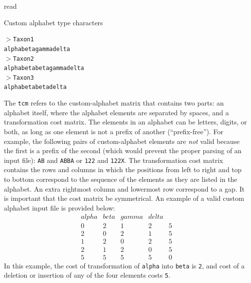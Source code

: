 \begin{command}{read}{}
\begin{arguments}
\begin{argumentgroup}{Custom alphabet type characters}
{          \texttt{$>$Taxon1\\
	\indent alphabetagammadelta\\
	\indent $>$Taxon2\\
	\indent alphabetabetagammadelta\\
	\indent $>$Taxon3\\
	\indent alphabetabetadelta\\}
	
             The \texttt{tcm} refers to the custom-alphabet matrix that contains two parts:
            an alphabet itself, where the alphabet elements are separated by spaces, and a
            transformation cost matrix. The elements in an alphabet can be letters, digits, or
            both, as long as one element is not a prefix of another  (``prefix-free''). For
            example, the following pairs of custom-alphabet elements are \emph{not} valid
            because the first is a prefix of the second (which would prevent the proper parsing of
            an input file): \texttt{AB} and \texttt{ABBA} or \texttt{122} and \texttt{122X}.
            The transformation cost matrix contains the rows and columns in which the
            positions from left to right and top to bottom correspond to the sequence of the
            elements as they are listed in the alphabet. An extra rightmost column and lowermost
            row correspond to a gap. It is important that the cost matrix  be symmetrical. An example 
            of a valid custom alphabet input file is provided below:
       	  \\
	       \begin{equation*}
                \begin{array}{lllll}
                      alpha & beta & gamma & delta &   \\
                    0 &     2 &    1 &     2 &     5 \\
                    2 &     0 &    2 &     1 &     5 \\
                    1 &     2 &    0 &     2 &     5 \\
                    2 &     1 &    2 &     0 &     5 \\
                    5 &     5 &    5 &     5 &     0
                 \end{array}
            \end{equation*} 
           In this example, the cost of transformation of \texttt{alpha} into \texttt{beta} is \texttt{2},
           and cost of a deletion or insertion of any of the four elements costs \texttt{5}.
           
}
\end{argumentgroup}
\end{arguments}
\end{command}
